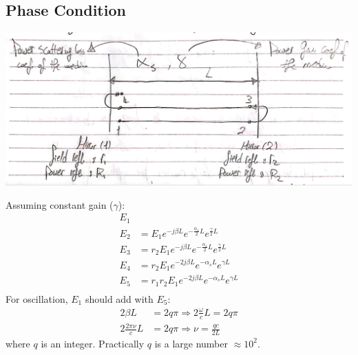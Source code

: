 \documentclass[11pt]{article}
\begin{document}
\subsection{Phase Condition}
\begin{center}
    \includegraphics[scale=0.65]{7.png}
\end{center}
Assuming constant gain ($\gamma$):
\begin{align*}
    E_1 \\
    E_2 &= E_1 e^{-j \beta L} e^{-\frac{\alpha_s}{2} L} e^{\frac{\gamma}{2} L} \\
    E_3 &= r_2 E_1 e^{-j \beta L} e^{-\frac{\alpha_s}{2} L} e^{\frac{\gamma}{2} L} \\
    E_4 &= r_2 E_1 e^{-2j \beta L} e^{-\alpha_s L} e^{\gamma L} \\
    E_5 &= r_1 r_2 E_1 e^{-2j \beta L} e^{-\alpha_s L} e^{\gamma L} \\
\end{align*}
For oscillation, $E_1$ should add with $E_5$:
\begin{align*}
    2 \beta L &= 2 q \pi \Rightarrow 2 \frac{\omega}{c} L = 2 q \pi \\
    2 \frac{2 \pi \nu}{c} L &= 2 q \pi \Rightarrow \nu = \frac{qc}{2L}
\end{align*}
where $q$ is an integer. Practically $q$ is a large number $\approx 10^2$. 
\end{document}
